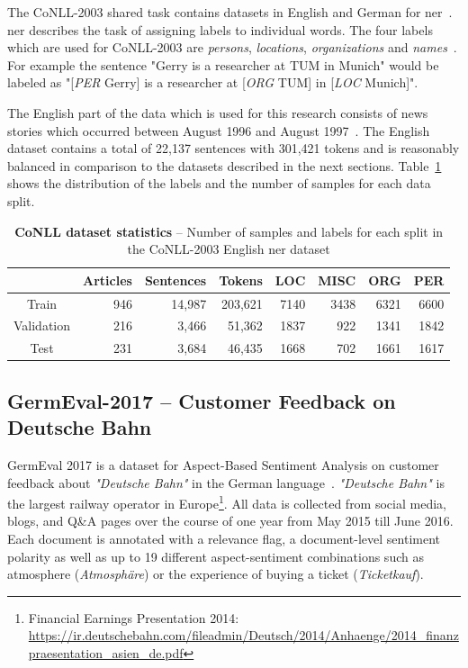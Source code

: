 The CoNLL-2003 shared task contains datasets in English and German for \acrfull{ner}~\cite{Erik2003}. \gls{ner} describes the task of assigning labels to individual words. The four labels which are used for CoNLL-2003 are \textit{persons}, \textit{locations}, \textit{organizations} and \textit{names}~\cite{Erik2003}. For example the sentence "Gerry is a researcher at TUM in Munich" would be labeled as "[\textit{PER} Gerry] is a researcher at [\textit{ORG} TUM] in [\textit{LOC} Munich]".
\medskip

The English part of the data which is used for this research consists of news stories which occurred between August 1996 and August 1997~\cite{Erik2003}. The English dataset contains a total of 22,137 sentences with 301,421 tokens and is reasonably balanced in comparison to the datasets described in the next sections. Table~\ref{tab:05_conll2003DatasetStats} shows the distribution of the labels and the number of samples for each data split.

\begin{table}
    \centering
    \begin{tabular}{crrrrrrr}
        \toprule
        & Articles & Sentences & Tokens & LOC & MISC & ORG & PER \\ 
        \midrule
        Train & 946 & 14,987 & 203,621 & 7140 & 3438 & 6321 & 6600 \\ 
        Validation & 216 & 3,466 & 51,362 & 1837 & 922 & 1341 & 1842 \\ 
        Test & 231 & 3,684 & 46,435 & 1668 & 702 & 1661 & 1617 \\ 
        \bottomrule 
    \end{tabular} 
\caption{\textbf{CoNLL dataset statistics} -- Number of samples and labels for each split in the CoNLL-2003 English \gls{ner} dataset}
\label{tab:05_conll2003DatasetStats}
\end{table}


\subsection{GermEval-2017 -- Customer Feedback on Deutsche Bahn}
\label{sec:05_germeval}
GermEval 2017 is a dataset for Aspect-Based Sentiment Analysis on customer feedback about \textit{"Deutsche Bahn"} in the German language~\cite{Wojatzki2017}. \textit{"Deutsche Bahn"} is the largest railway operator in Europe\footnote{Financial Earnings Presentation 2014: \url{https://ir.deutschebahn.com/fileadmin/Deutsch/2014/Anhaenge/2014_finanzpraesentation_asien_de.pdf}}. All data is collected from social media, blogs, and Q\&A pages over the course of one year from May 2015 till June 2016. Each document is annotated with a relevance flag, a document-level sentiment polarity as well as up to 19 different aspect-sentiment combinations such as atmosphere {(\textit{Atmosphäre})} or the experience of buying a ticket {(\textit{Ticketkauf})}.
\medskip

